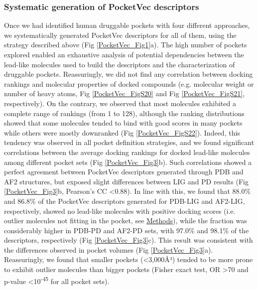
\subsubsection{Systematic generation of PocketVec descriptors}
\label{PocketVec_ResultsAndDiscussion_Systematic_generation_of_PocketVec_descriptors}


Once we had identified human druggable pockets with four different approaches, we systematically generated PocketVec descriptors for all of them, using the strategy described above (Fig \ref{PocketVec_Fig1}a). The high number of pockets explored enabled an exhaustive analysis of potential dependencies between the lead-like molecules used to build the descriptors and the characterization of druggable pockets. Reassuringly, we did not find any correlation between docking rankings and molecular properties of docked compounds (e.g. molecular weight or number of heavy atoms, Fig \ref{PocketVec_FigS20} and Fig \ref{PocketVec_FigS21}, respectively). On the contrary, we observed that most molecules exhibited a complete range of rankings (from 1 to 128), although the ranking distributions showed that some molecules tended to bind with good scores in many pockets while others were mostly downranked (Fig \ref{PocketVec_FigS22}). Indeed, this tendency was observed in all pocket definition strategies, and we found significant correlations between the average docking rankings for docked lead-like molecules among different pocket sets (Fig \ref{PocketVec_Fig3}b). Such correlations showed a perfect agreement between PocketVec descriptors generated through PDB and AF2 structures, but exposed slight differences between LIG and PD results (Fig \ref{PocketVec_Fig3}b, Pearson’s CC <0.88). In line with this, we found that 88.0\% and 86.8\% of the PocketVec descriptors generated for PDB-LIG and AF2-LIG, respectively, showed no lead-like molecules with positive docking scores (i.e. outlier molecules not fitting in the pocket, see \hyperref[PocketVec_Methods]{Methods}), while the fraction was considerably higher in PDB-PD and AF2-PD sets, with 97.0\% and 98.1\% of the descriptors, respectively (Fig \ref{PocketVec_Fig3}c). This result was consistent with the differences observed in pocket volumes (Fig \ref{PocketVec_Fig3}a). Reassuringly, we found that smaller pockets (<3,000Å³) tended to be more prone to exhibit outlier molecules than bigger pockets (Fisher exact test, OR >70 and p-value <10\textsuperscript{-45} for all pocket sets).


